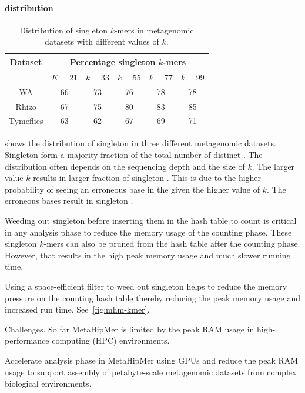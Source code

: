 \paragraph{\Kmer distribution}

\begin{table}
\centering
    \begin{tabular}{c | c | c | c | c | c}
    \toprule
    \textbf{Dataset} & \multicolumn{5}{c}{\textbf{Percentage singleton $k$-mers}} \\
    \midrule
    & $K=21$ & $k=33$ & $k=55$ & $k=77$ & $k=99$ \\
    \midrule
    WA &  66 & 73 & 76 & 78 & 78  \\
    Rhizo &  67 & 75 & 80 & 83 & 85  \\
    Tymeflies & 63 & 62 & 67 & 69 & 71 \\
    \bottomrule
    \end{tabular}
    \caption{Distribution of singleton $k$-mers in metagenomic datasets with different values of $k$.}
    \label{tab:kmer-dist}
\end{table}

 shows the distribution of singleton \kmers in three
different metagenomic datasets. Singleton \kmers form a majority fraction of
the total number of distinct \kmers. The distribution often depends on the
sequencing depth and the size of $k$. The larger value $k$ results in larger
fraction of singleton \kmers. This is due to the higher probability of seeing
an erroneous base in the \kmer given the higher value of $k$. The erroneous
bases result in singleton \kmers.

Weeding out singleton \kmers before inserting them in the hash table to count
is critical in any \kmer analysis phase to reduce the memory usage of the
counting phase. These singleton $k$-mers can also be pruned from the hash table
after the counting phase. However, that results in the high peak memory usage
and much slower running time.

Using a space-efficient filter to weed out singleton \kmers helps to reduce
the memory pressure on the counting hash table thereby reducing the peak memory
usage and increased run time. See~\cref{fig:mhm-kmer}.


\noindent
{Challenges.}
So far MetaHipMer is limited by the peak RAM usage in high-performance computing (HPC) environments.

\begin{rproblem}
Accelerate \kmer analysis phase in MetaHipMer using GPUs and reduce the peak RAM usage to support assembly of petabyte-scale metagenomic datasets from complex biological environments.
\label{rprob:peppermint4}
\end{rproblem}

